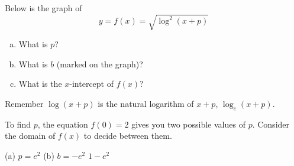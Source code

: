 \begin{Mquestion}
Below is the graph of
\[y=f(x)=\sqrt{\log^2(x+p)}\]
\begin{enumerate}[(a)]
\item What is $p$?
\item What is $b$ (marked on the graph)?
\item What is the $x$-intercept of $f(x)$?
\end{enumerate}
Remember $\log(x+p)$ is the natural logarithm of $x+p$, $\log_e(x+p)$.

\begin{center}
\end{center}
\end{Mquestion}
\begin{hint}
To find $p$, the equation $f(0)=2$ gives you two possible values of $p$. Consider the domain of $f(x)$ to decide between them.
\end{hint}
\begin{answer}
(a) $p=e^2$ \qquad (b) $b=-e^2$ \qquad $1-e^2$
\end{answer}
